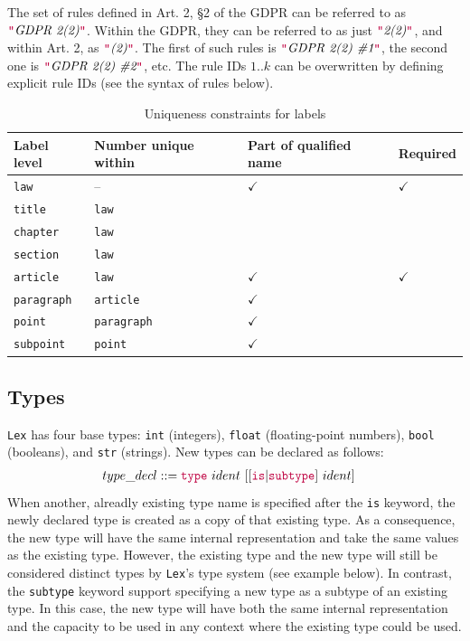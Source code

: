 \documentclass[runningheads]{llncs}
\newcommand{\Lex}{\texttt{Lex}}
\newcommand{\kw}[1]{{\color{purple}\texttt{#1}}}
\begin{document}
\begin{example}
  The set of rules defined in Art. 2, §2 of the GDPR can be referred to as
  $\kw{"}\text{\itshape GDPR~2(2)}\kw{"}$. Within the GDPR, they can be referred to as just
  $\kw{"}\text{\itshape 2(2)}\kw{"}$, and within Art. 2, as $\kw{"}\text{\itshape (2)}\kw{"}$.
  The first of such rules is $\kw{"}\text{\itshape GDPR~2(2)~\#1}\kw{"}$, the second one is
  $\kw{"}\text{\itshape GDPR~2(2)~\#2}\kw{"}$, etc. The rule IDs $1..k$ can be overwritten
  by defining explicit rule IDs (see the syntax of rules below).
\end{example}

\begin{table}
  \centering
  \begin{tabular}{llll}
    \hline
    Label level & Number unique within & Part of qualified name & Required \\
    \hline
    \kw{law} & -- & $\checkmark$ & $\checkmark$ \\
    \kw{title} & \kw{law} \\
    \kw{chapter} & \kw{law}\\
    \kw{section} & \kw{law} \\
    \kw{article} & \kw{law} & $\checkmark$ & $\checkmark$ \\
    \kw{paragraph} & \kw{article} & $\checkmark$ \\
    \kw{point} & \kw{paragraph} & $\checkmark$ \\
    \kw{subpoint} & \kw{point} & $\checkmark$ \\
    \hline
  \end{tabular}
  \vspace{10pt}
  \caption{Uniqueness constraints for labels\label{tab:uniqueness}}
\end{table}



\subsection{Types}

\Lex{} has four base types: \kw{int} (integers), \kw{float} (floating-point numbers), \kw{bool} (booleans), and \kw{str} (strings).
New types can be declared as follows:
\begin{align*}
  type\_decl &::= \kw{type}~ident~[[\kw{is}|\kw{subtype}]~ident]
\end{align*}
When another, alreadly existing type name is specified after the \kw{is} keyword, the newly declared type is created as a copy of that existing type. As a consequence, the new type will have the same internal representation and take the same values as the existing type. However, the existing type and the new type will still be considered distinct types by \Lex{}'s type system (see example below). In contrast, the \kw{subtype} keyword support specifying a new type as a subtype of an existing type. In this case, the new type will have both the same internal representation and the capacity to be used in any context where the existing type could be used.
\end{document}
